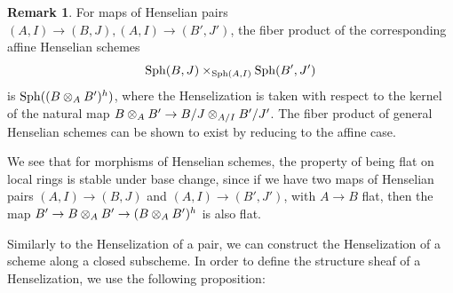 \documentclass[12pt]{article}
\newcommand{\sph}{{\rm Sph}}
\theoremstyle{definition}
\newtheorem{remark}[theorem]{Remark}
\numberwithin{equation}{subsection}
\begin{document}
\begin{remark}\label{rmk:fibprod} For maps of Henselian pairs $(A,I) \to (B,J), (A,I) \to (B',J')$, the fiber product of the corresponding affine Henselian schemes $$\sph(B,J) \times_{\sph(A,I)} \sph(B',J')$$ is $\sph((B \tens_A B')^h)$, where the Henselization is taken with respect to the kernel of the natural map $B \tens_A B' \to B/J \tens_{A/I} B'/J'$. The fiber product of general Henselian schemes can be shown to exist by reducing to the affine case.

We see that for morphisms of Henselian schemes, the property of being flat on local rings is stable under base change, since if we have two maps of Henselian pairs $(A,I) \to (B,J)$ and $(A,I) \to (B',J')$, with $A \to B$ flat, then the map $B' \to B \tens_A B' \to (B \tens_A B')^h$ is also flat.
\end{remark}


Similarly to the Henselization of a pair, we can construct the Henselization of a scheme along a closed subscheme. In order to define the structure sheaf of a Henselization, we use the following proposition:
\end{document}
